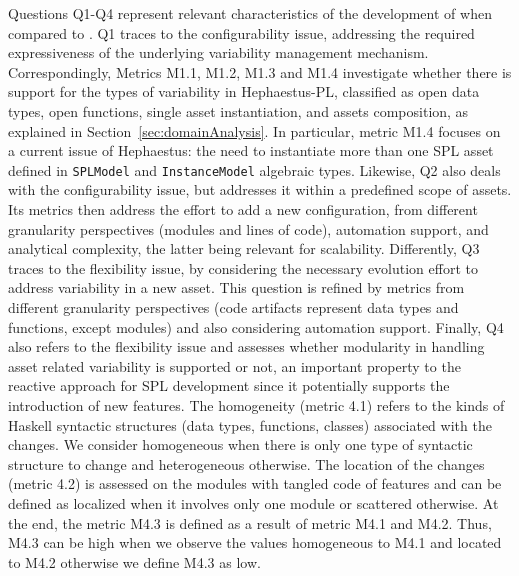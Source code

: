 Questions Q1-Q4 represent relevant characteristics of the development of \hpl{} when compared to \hp. Q1 traces to the configurability issue, addressing the required expressiveness of the underlying variability management mechanism. Correspondingly, Metrics M1.1, M1.2, M1.3 and M1.4 investigate whether there is support for the types of variability in Hephaestus-PL, classified as open data types, open functions, single asset instantiation, and assets composition, as explained in Section~\ref{sec:domainAnalysis}.
In particular, metric M1.4 focuses on a current issue of Hephaestus: the need to instantiate more than one SPL asset defined in \texttt{SPLModel} and \texttt{InstanceModel} algebraic types.
Likewise, Q2 also deals with the configurability issue, but addresses it within a predefined scope of assets. Its metrics then address the effort to add a new configuration, from different granularity perspectives (modules and lines of code), automation support, and analytical complexity, the latter being relevant for scalability.
Differently, Q3 traces to the flexibility issue, by considering the necessary evolution effort to address variability in a new asset. This question is refined by metrics from different granularity perspectives (code artifacts represent data types and functions, except modules) and also considering automation support. Finally, Q4 also refers to the flexibility issue and assesses whether modularity in handling asset related variability is supported or not, an important property to the reactive approach for SPL development since it potentially supports the introduction of new features. 
The homogeneity (metric 4.1) refers to the kinds of Haskell syntactic structures (data types, functions, classes) associated with the changes. We consider homogeneous when there is only one type of syntactic structure to change and heterogeneous otherwise. 
The location of the changes (metric 4.2) is assessed on the modules with tangled code of features and can be defined as localized when it involves only one module or scattered otherwise. 
At the end, the metric M4.3 is defined as a result of metric M4.1 and M4.2. Thus, M4.3 can be high when we observe the values homogeneous to M4.1 and located to M4.2 otherwise we define M4.3 as low.



